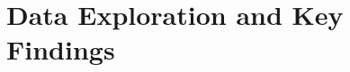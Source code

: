 \documentclass[logo,msc]{infthesis}
\begin{document}
\section{Data Exploration and Key Findings}
%
%
%
%
%
%
\end{document}
